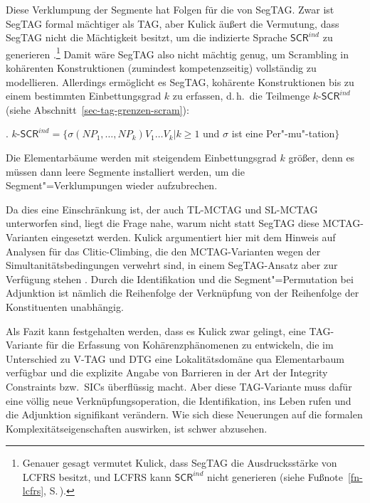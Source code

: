 Diese Verklumpung der Segmente hat Folgen für die  von SegTAG. Zwar ist SegTAG formal mächtiger als TAG, aber Kulick äu\ss ert die Vermutung, dass SegTAG nicht die Mächtigkeit besitzt, um die indizierte Sprache $\mathsf{SCR}^{ind}$ zu generieren \citep[215]{Kulick:00}.\footnote{Genauer gesagt vermutet Kulick, dass SegTAG die Ausdrucksstärke von LCFRS besitzt, und LCFRS kann $\mathsf{SCR}^{ind}$ nicht generieren (siehe Fußnote~\ref{fn-lcfrs}, S.\,\pageref{fn-lcfrs}).} Damit wäre SegTAG also nicht mächtig genug, um Scrambling in kohärenten Konstruktionen (zumindest kompetenzseitig) vollständig zu modellieren. Allerdings ermöglicht es SegTAG, kohärente Konstruktionen bis zu einem bestimmten Einbettungsgrad $k$ zu erfassen, d.\,h.\ die Teilmenge $k$-$\mathsf{SCR}^{ind}$ (siehe Abschnitt~\ref{sec-tag-grenzen-scram}):

\ex. $k$-$\mathsf{SCR}^{ind} = \{ \sigma(\mathit{NP}_1,\ldots,\mathit{NP}_k) V_1 \ldots V_k | k \geq 1$ und $\sigma$ ist eine Per"-mu"-tation$\}$

Die Elementarbäume werden mit steigendem Einbettungsgrad $k$ grö\ss er, denn es müssen dann leere Segmente installiert werden, um die Segment"=Verklumpungen wieder aufzubrechen. 

Da dies eine Einschränkung ist, der auch TL-MCTAG und SL-MCTAG unterworfen sind, liegt die Frage nahe, warum nicht statt SegTAG diese MCTAG-Varianten eingesetzt werden. Kulick argumentiert hier mit dem Hinweis auf Analysen für das Clitic-Climbing, die den MCTAG-Varianten wegen der Simultanitätsbedingungen verwehrt sind, in einem SegTAG-Ansatz aber zur Verfügung stehen \citep[53ff]{Kulick:00}. Durch die Identifikation und die Segment"=Permutation bei Adjunktion ist nämlich die Reihenfolge der Verknüpfung von der Reihenfolge der Konstituenten unabhängig.     

Als Fazit kann festgehalten werden, dass es Kulick zwar gelingt, eine TAG-Variante für die Erfassung von Kohärenzphänomenen zu entwickeln, die im Unterschied zu V-TAG und DTG eine Lokalitätsdomäne qua Elementarbaum verfügbar und die explizite Angabe von Barrieren in der Art der Integrity Constraints bzw.\ SICs überflüssig macht. Aber diese TAG-Variante muss dafür eine völlig neue Verknüpfungsoperation, die Identifikation, ins Leben rufen und die Adjunktion signifikant verändern. Wie sich diese Neuerungen auf die formalen Komplexitätseigenschaften auswirken, ist schwer abzusehen.


